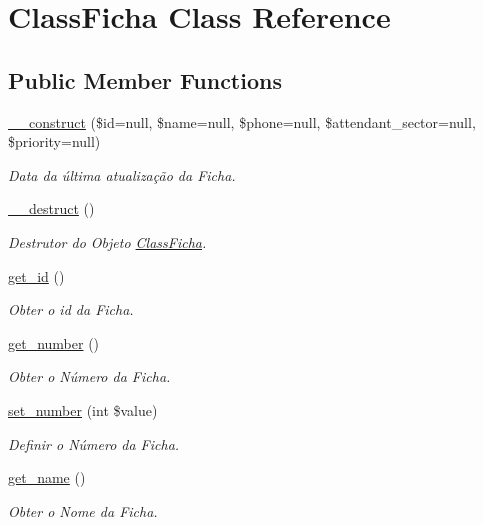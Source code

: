 \hypertarget{class_class_ficha}{}\section{Class\+Ficha Class Reference}
\label{class_class_ficha}
\subsection*{Public Member Functions}
\begin{DoxyCompactItemize}
\item 
\hyperlink{class_class_ficha_a3a06b9d4c5367aa8594f8b8a280ba4af}{\+\_\+\+\_\+construct} (\$id=null, \$name=null, \$phone=null, \$attendant\+\_\+sector=null, \$priority=null)
\begin{DoxyCompactList}\small\item\em Data da última atualização da Ficha. \end{DoxyCompactList}\item 
\hyperlink{class_class_ficha_a421831a265621325e1fdd19aace0c758}{\+\_\+\+\_\+destruct} ()
\begin{DoxyCompactList}\small\item\em Destrutor do Objeto \hyperlink{class_class_ficha}{Class\+Ficha}. \end{DoxyCompactList}\item 
\hyperlink{class_class_ficha_a8a94003b9d888b085c68d6eac44be175}{get\+\_\+id} ()
\begin{DoxyCompactList}\small\item\em Obter o id da Ficha. \end{DoxyCompactList}\item 
\hyperlink{class_class_ficha_a4f7969072fea809005ea1306a8e7ea83}{get\+\_\+number} ()
\begin{DoxyCompactList}\small\item\em Obter o Número da Ficha. \end{DoxyCompactList}\item 
\hyperlink{class_class_ficha_a2d73b58ab74d3f4449797ce66855ba12}{set\+\_\+number} (int \$value)
\begin{DoxyCompactList}\small\item\em Definir o Número da Ficha. \end{DoxyCompactList}\item 
\hyperlink{class_class_ficha_a4f1149ccbd69d1ac4225b7bc2dd871bb}{get\+\_\+name} ()
\begin{DoxyCompactList}\small\item\em Obter o Nome da Ficha. \end{DoxyCompactList}\item 

\end{DoxyCompactItemize}

